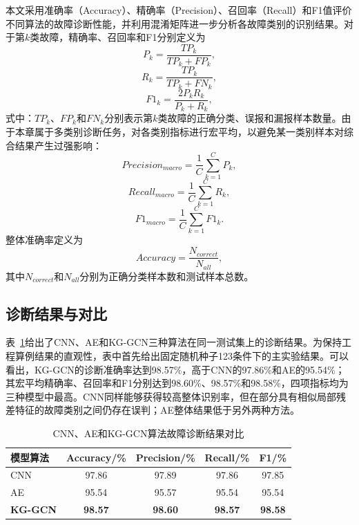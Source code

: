 本文采用准确率（Accuracy）、精确率（Precision）、召回率（Recall）和F1值评价不同算法的故障诊断性能，并利用混淆矩阵进一步分析各故障类别的识别结果。对于第$k$类故障，精确率、召回率和F1分别定义为
\begin{equation}
P_k=\frac{TP_k}{TP_k+FP_k},
\end{equation}
\begin{equation}
R_k=\frac{TP_k}{TP_k+FN_k},
\end{equation}
\begin{equation}
F1_k=\frac{2P_kR_k}{P_k+R_k},
\end{equation}
式中：$TP_k$、$FP_k$和$FN_k$分别表示第$k$类故障的正确分类、误报和漏报样本数量。由于本章属于多类别诊断任务，对各类别指标进行宏平均，以避免某一类别样本对综合结果产生过强影响：
\begin{equation}
Precision_{macro}=\frac{1}{C}\sum_{k=1}^{C}P_k,
\end{equation}
\begin{equation}
Recall_{macro}=\frac{1}{C}\sum_{k=1}^{C}R_k,
\end{equation}
\begin{equation}
F1_{macro}=\frac{1}{C}\sum_{k=1}^{C}F1_k .
\end{equation}
整体准确率定义为
\begin{equation}
Accuracy=\frac{N_{correct}}{N_{all}},
\end{equation}
其中$N_{correct}$和$N_{all}$分别为正确分类样本数和测试样本总数。

\subsection{诊断结果与对比}
\label{subsec:results_v5}

表~\ref{tab:main_result_v5}给出了CNN、AE和KG-GCN三种算法在同一测试集上的诊断结果。为保持工程算例结果的直观性，表中首先给出固定随机种子123条件下的主实验结果。可以看出，KG-GCN的诊断准确率达到98.57\%，高于CNN的97.86\%和AE的95.54\%；其宏平均精确率、召回率和F1分别达到98.60\%、98.57\%和98.58\%，四项指标均为三种模型中最高。CNN同样能够获得较高整体识别率，但在部分具有相似局部残差特征的故障类别之间仍存在误判；AE整体结果低于另外两种方法。

\begin{table}[htbp]
    \centering
    \caption{CNN、AE和KG-GCN算法故障诊断结果对比}
    \label{tab:main_result_v5}
    \begin{tabular}{lcccc}
        \toprule
        模型算法 & Accuracy/\% & Precision/\% & Recall/\% & F1/\% \\
        \midrule
        CNN & 97.86 & 97.89 & 97.86 & 97.85 \\
        AE & 95.54 & 95.57 & 95.54 & 95.54 \\
        \textbf{KG-GCN} & \textbf{98.57} & \textbf{98.60} & \textbf{98.57} & \textbf{98.58} \\
        \bottomrule
    \end{tabular}
\end{table}

